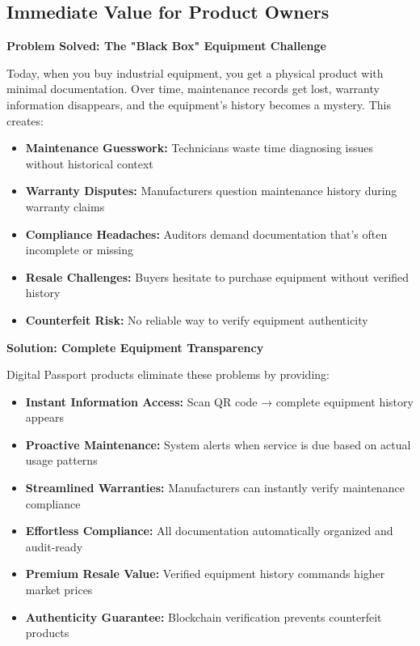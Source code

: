 \documentclass[11pt,a4paper]{article}
\begin{document}
\subsection{Immediate Value for Product Owners}

\textbf{Problem Solved: The "Black Box" Equipment Challenge}

Today, when you buy industrial equipment, you get a physical product with minimal documentation. Over time, maintenance records get lost, warranty information disappears, and the equipment's history becomes a mystery. This creates:

\begin{itemize}[leftmargin=0.5cm]
    \item \textbf{Maintenance Guesswork:} Technicians waste time diagnosing issues without historical context
    \item \textbf{Warranty Disputes:} Manufacturers question maintenance history during warranty claims  
    \item \textbf{Compliance Headaches:} Auditors demand documentation that's often incomplete or missing
    \item \textbf{Resale Challenges:} Buyers hesitate to purchase equipment without verified history
    \item \textbf{Counterfeit Risk:} No reliable way to verify equipment authenticity
\end{itemize}

\textbf{Solution: Complete Equipment Transparency}

Digital Passport products eliminate these problems by providing:

\begin{itemize}[leftmargin=0.5cm]
    \item \textbf{Instant Information Access:} Scan QR code → complete equipment history appears
    \item \textbf{Proactive Maintenance:} System alerts when service is due based on actual usage patterns
    \item \textbf{Streamlined Warranties:} Manufacturers can instantly verify maintenance compliance
    \item \textbf{Effortless Compliance:} All documentation automatically organized and audit-ready
    \item \textbf{Premium Resale Value:} Verified equipment history commands higher market prices
    \item \textbf{Authenticity Guarantee:} Blockchain verification prevents counterfeit products
\end{itemize}
\end{document}
